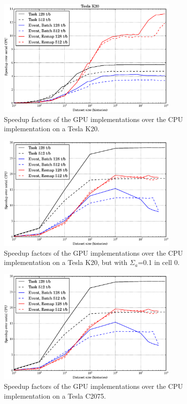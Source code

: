 \begin{figure}[h!] 
  \centering
    \includegraphics[width=0.8\textwidth]{graphics/prelim_speedup_k20.eps}
     \caption{Speedup factors of the GPU implementations over the CPU implementation on a Tesla K20. \label{prelim_speedup_01} }
\end{figure}

\begin{figure}[h!] 
  \centering
    \includegraphics[width=0.8\textwidth]{graphics/prelim_speedup_old.eps}
     \caption{Speedup factors of the GPU implementations over the CPU implementation on a Tesla K20, but with $\Sigma_a$=0.1 in cell 0. \label{prelim_speedup_1} }
\end{figure}

\begin{figure}[h!] 
  \centering
    \includegraphics[width=0.8\textwidth]{graphics/prelim_speedup_old.eps}
     \caption{Speedup factors of the GPU implementations over the CPU implementation on a Tesla C2075. \label{prelim_speedup_old} }
\end{figure}

